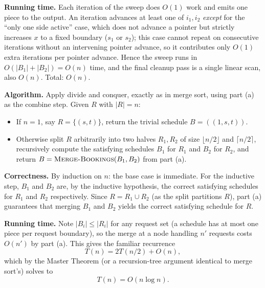 \documentclass[12pt,twoside]{article}
\begin{document}
\begin{problems}
\begin{problemparts}
\textbf{Running time.} Each iteration of the sweep does $O(1)$ work and
emits one piece to the output. An iteration advances at least one of
$i_1,i_2$ \emph{except} for the ``only one side active'' case, which does
not advance a pointer but strictly increases $x$ to a fixed boundary
($s_1$ or $s_2$); this case cannot repeat on consecutive iterations without
an intervening pointer advance, so it contributes only $O(1)$ extra
iterations per pointer advance. Hence the sweep runs in
$O(|B_1|+|B_2|) = O(n)$ time, and the final cleanup pass is a single linear
scan, also $O(n)$. Total: $O(n)$.

\problempart
\textbf{Algorithm.}
Apply divide and conquer, exactly as in merge sort, using part (a) as the
combine step. Given $R$ with $|R|=n$:
\begin{itemize}
  \item If $n=1$, say $R=\{(s,t)\}$, return the trivial schedule
        $B=((1,s,t))$.
  \item Otherwise split $R$ arbitrarily into two halves $R_1,R_2$ of size
        $\lfloor n/2\rfloor$ and $\lceil n/2\rceil$, recursively compute the
        satisfying schedules $B_1$ for $R_1$ and $B_2$ for $R_2$, and return
        $B = \textsc{Merge-Bookings}(B_1,B_2)$ from part (a).
\end{itemize}

\textbf{Correctness.} By induction on $n$: the base case is immediate. For
the inductive step, $B_1$ and $B_2$ are, by the inductive hypothesis, the
correct satisfying schedules for $R_1$ and $R_2$ respectively. Since
$R = R_1 \cup R_2$ (as the split partitions $R$), part (a) guarantees that
merging $B_1$ and $B_2$ yields the correct satisfying schedule for $R$.

\textbf{Running time.} Note $|B_i| \le |R_i|$ for any request set (a
schedule has at most one piece per request boundary), so the merge at a
node handling $n'$ requests costs $O(n')$ by part (a). This gives the
familiar recurrence
$$T(n) = 2T(n/2) + O(n),$$
which by the Master Theorem (or a recursion-tree argument identical to
merge sort's) solves to
$$T(n) = O(n\log n).$$
\end{problemparts}

\end{problems}
\end{document}
